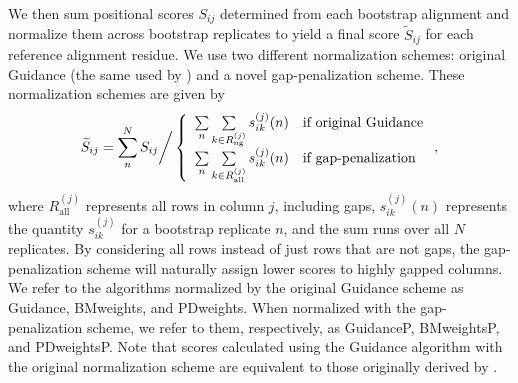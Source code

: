 \documentclass[10pt]{article}
\begin{document}
We then sum positional scores $S_{ij}$ determined from each bootstrap alignment and normalize them across bootstrap replicates to yield a final score $\widetilde{S}_{ij}$ for each reference alignment residue. We use two different normalization schemes: original Guidance (the same used by \citet{Penn2010}) and a novel gap-penalization scheme. These normalization schemes are given by \begin{equation}
\widetilde{S}_{ij}  = \sum_n^N S_{ij} \bigg{/} \left\{ \begin{array}{rl}

              \sum\limits_n \sum\limits_{k \in R_\text{ng}^{(j)}} s_{ik}^{(j)}(n)     &\mbox{if original Guidance} \\
              \sum\limits_n \sum\limits_{k \in R_\text{all}^{(j)}} s_{ik}^{(j)}(n)     &\mbox{if gap-penalization} \\      
        \end{array} \right.,
\end{equation} 
where $R_\text{all}^{(j)}$ represents all rows in column $j$, including gaps, $s_{ik}^{(j)}(n)$ represents the quantity $s_{ik}^{(j)}$ for a  bootstrap replicate $n$, and the sum runs over all $N$ replicates. By considering all rows instead of just rows that are not gaps, the gap-penalization scheme will naturally assign lower scores to highly gapped columns. We refer to the algorithms normalized by the original Guidance scheme as Guidance, BMweights, and PDweights. When normalized with the gap-penalization scheme, we refer to them, respectively, as GuidanceP, BMweightsP, and PDweightsP. Note that scores calculated using the Guidance algorithm with the original normalization scheme are equivalent to those originally derived by \citet{Penn2010}. 
\end{document}
